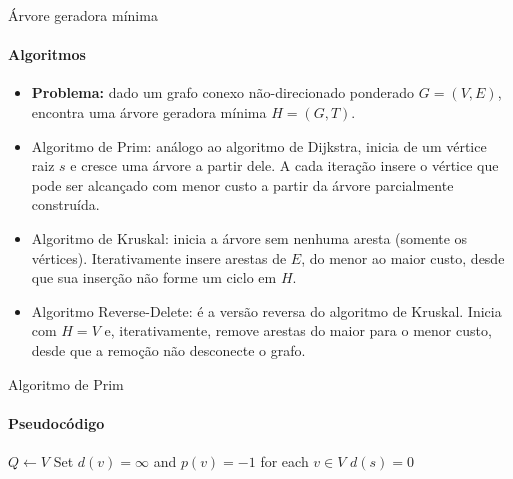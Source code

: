 \begin{frame}{Árvore geradora mínima}
	\framesubtitle{Algoritmos}
	
	\begin{itemize}
		\item \textbf{Problema:} dado um grafo conexo não-direcionado ponderado $G = (V, E)$, encontra uma árvore geradora mínima $H = (G, T)$.
		
		\medskip
		
		\pause
		
		\item {\color{magenta}Algoritmo de Prim:} análogo ao algoritmo de Dijkstra, inicia de um vértice raiz $s$ e cresce uma árvore a partir dele. A cada iteração insere o vértice que pode ser alcançado com menor custo a partir da árvore parcialmente construída.
		
		\pause
		
		\item {\color{magenta}Algoritmo de Kruskal:} inicia a árvore sem nenhuma aresta (somente os vértices). Iterativamente insere arestas de $E$, do menor ao maior custo, desde que sua inserção não forme um ciclo em $H$.
		
		\pause
		
		\item {\color{magenta}Algoritmo Reverse-Delete:} é a versão reversa do algoritmo de Kruskal. Inicia com $H = V$ e, iterativamente, remove arestas do maior para o menor custo, desde que a remoção não desconecte o grafo.
	\end{itemize}
\end{frame}



\begin{frame}{Algoritmo de Prim}
	\framesubtitle{Pseudocódigo}
	
	\begin{algorithm}[H]
		\DontPrintSemicolon
		
		$Q \gets V$\;
		Set $d(v) = \infty$ and $p(v) = -1$ for each $v \in V$\;
		$d(s) = 0$\;
		
		
		\caption{\texttt{prim(Vertex s)}}
	\end{algorithm}
\end{frame}



